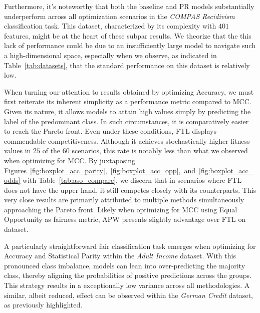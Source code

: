 Furthermore, it's noteworthy that both the baseline and PR models substantially underperform across all optimization scenarios in the \textit{COMPAS Recidivism} classification task. This dataset, characterized by its complexity with $401$ features, might be at the heart of these subpar results. We theorize that the this lack of performance could be due to an insufficiently large model to navigate such a high-dimensional space, especially when we observe, as indicated in Table~\ref{tab:datasets}, that the standard performance on this dataset is relatively low.

When turning our attention to results obtained by optimizing Accuracy, we must first reiterate its inherent simplicity as a performance metric compared to MCC. Given its nature, it allows models to attain high values simply by predicting the label of the predominant class. In such circumstances, it is comparatively easier to reach the Pareto front. Even under these conditions, FTL displays commendable competitiveness. Although it achieves stochastically higher fitness values in $25$ of the $60$ scenarios, this rate is notably less than what we observed when optimizing for MCC. By juxtaposing Figures~\ref{fig:boxplot_acc_parity},~\ref{fig:boxplot_acc_opp},~and~\ref{fig:boxplot_acc_odds} with Table~\ref{tab:aso_compare}, we discern that in scenarios where FTL does not have the upper hand, it still competes closely with its counterparts. This very close results are primarily attributed to multiple methods simultaneously approaching the Pareto front. Likely when optimizing for MCC using Equal Opportunity as fairness metric, APW presents slightly advantage over FTL on  dataset.

A particularly straightforward fair classification task emerges when optimizing for Accuracy and Statistical Parity within the \emph{Adult Income} dataset. With this pronounced class imbalance, models can lean into over-predicting the majority class, thereby aligning the probabilities of positive predictions across the groups. This strategy results in a exceptionally low variance across all methodologies. A similar, albeit reduced, effect can be observed within the \textit{German Credit} dataset, as previously highlighted.

